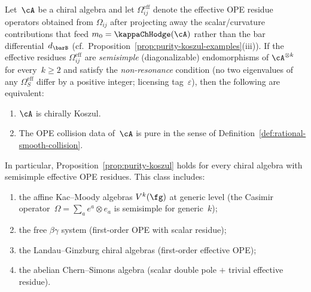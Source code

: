\begin{theorem}
\label{thm:semisimple-purity}
Let~$\cA$ be a chiral algebra and let $\Omega_{ij}^{\mathrm{eff}}$
denote the effective OPE residue operators obtained from
$\Omega_{ij}$ after projecting away the scalar\textup{/}curvature
contributions that feed $m_0 = \kappaChHodge(\cA)$ rather than the
bar differential~$d_{\barB}$
\textup{(}cf.~Proposition~\textup{\ref{prop:purity-koszul-examples}(iii)).}
If the effective residues $\Omega_{ij}^{\mathrm{eff}}$ are
\emph{semisimple} \textup{(}diagonalizable\textup{)} endomorphisms
of $\cA^{\otimes k}$ for every~$k \geq 2$ and satisfy the
\emph{non-resonance} condition \textup{(}no two eigenvalues of any
$\Omega_S^{\mathrm{eff}}$ differ by a positive integer\textup{;}
licensing tag~$\varepsilon$\textup{)}, then the following
are equivalent\textup{:}
\begin{enumerate}[label=\textup{(\alph*)}]
\item $\cA$ is chirally Koszul.
\item The OPE collision data of~$\cA$ is pure in the sense
 of Definition~\textup{\ref{def:rational-smooth-collision}.}
\end{enumerate}
In particular, Proposition~\textup{\ref{prop:purity-koszul}}
holds for every chiral algebra with semisimple effective OPE
residues. This class includes\textup{:}
\begin{enumerate}[label=\textup{(\roman*)}]
\item the affine Kac--Moody algebras $V^k(\fg)$ at generic level
 \textup{(}the Casimir operator~$\Omega = \sum_a e^a \otimes e_a$
 is semisimple for generic~$k$\textup{);}
\item the free $\beta\gamma$ system
 \textup{(}first-order OPE with scalar residue\textup{);}
\item the Landau--Ginzburg chiral algebras
 \textup{(}first-order effective OPE\textup{);}
\item the abelian Chern--Simons algebra
 \textup{(}scalar double pole $+$ trivial effective residue\textup{).}
\end{enumerate}
\end{theorem}

